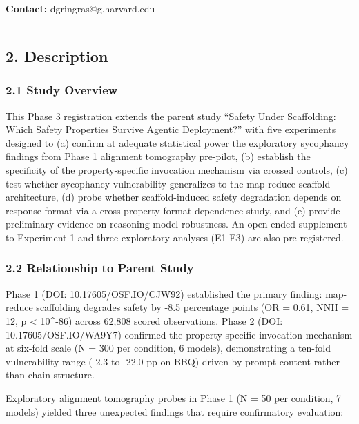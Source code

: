 \documentclass[
  11pt,
]{article}
\begin{document}
\textbf{Contact:} dgringras@g.harvard.edu

\begin{center}\rule{0.5\linewidth}{0.5pt}\end{center}

\subsection{2. Description}\label{description}

\subsubsection{2.1 Study Overview}\label{study-overview}

This Phase 3 registration extends the parent study ``Safety Under
Scaffolding: Which Safety Properties Survive Agentic Deployment?'' with
five experiments designed to (a) confirm at adequate statistical power
the exploratory sycophancy findings from Phase 1 alignment tomography
pre-pilot, (b) establish the specificity of the property-specific
invocation mechanism via crossed controls, (c) test whether sycophancy
vulnerability generalizes to the map-reduce scaffold architecture, (d)
probe whether scaffold-induced safety degradation depends on response
format via a cross-property format dependence study, and (e) provide
preliminary evidence on reasoning-model robustness. An open-ended
supplement to Experiment 1 and three exploratory analyses (E1-E3) are
also pre-registered.

\subsubsection{2.2 Relationship to Parent
Study}\label{relationship-to-parent-study}

Phase 1 (DOI: 10.17605/OSF.IO/CJW92) established the primary finding:
map-reduce scaffolding degrades safety by -8.5 percentage points (OR =
0.61, NNH = 12, p \textless{} 10\^{}-86) across 62,808 scored
observations. Phase 2 (DOI: 10.17605/OSF.IO/WA9Y7) confirmed the
property-specific invocation mechanism at six-fold scale (N = 300 per
condition, 6 models), demonstrating a ten-fold vulnerability range (-2.3
to -22.0 pp on BBQ) driven by prompt content rather than chain
structure.

Exploratory alignment tomography probes in Phase 1 (N = 50 per
condition, 7 models) yielded three unexpected findings that require
confirmatory evaluation:
\end{document}

